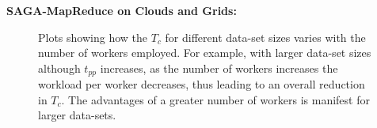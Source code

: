 \documentclass[conference,final]{IEEEtran}
\newcommand{\sagamapreduce }{SAGA-MapReduce }
\newcommand{\tc }{ $T_c$ }
\newcommand{\upp}{\vspace*{-0.5em}}
\begin{document}
{\bf SAGA-MapReduce on Clouds and Grids:} 
\begin{figure}[t]
  \caption{Plots showing how the \tc for different data-set sizes
    varies with the number of workers employed.  For example, with
    larger data-set sizes although $t_{pp}$ increases, as the number
    of workers increases the workload per worker decreases, thus
    leading to an overall reduction in $T_c$. The advantages of a
    greater number of workers is manifest for larger data-sets.}
\label{grids1}
\end{figure}

\end{document}
